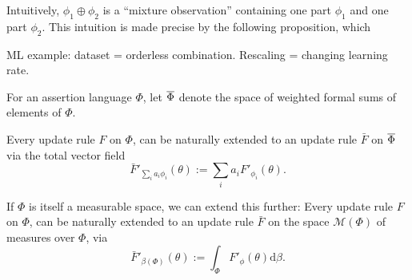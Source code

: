 Intuitively, $\phi_1 \oplus \phi_2$ is a ``mixture observation'' containing
one part $\phi_1$ and one part $\phi_2$. This intuition is made
precise by the following proposition, which 

\begin{prop}
	
\end{prop}

\begin{example}
	ML example: dataset = orderless combination.
	Rescaling = changing learning rate.

	\TODO
	
\end{example}


\begin{defn}
For an assertion language $\Phi$, let $\overline \Phi$ denote
the space of weighted formal sums of elements of $\Phi$.
\end{defn}

\begin{prop}
Every  update rule $F$ on $\Phi$, can be naturally extended to an update rule
$\bar F$ on $\overline \Phi$
via the total vector field
\[
    \bar F'_{\textstyle\sum_i a_i \phi_i} ( \theta ) := \sum_{i} a_i F'_{\phi_i}(\theta).
\]
%
\end{prop}

If $\Phi$ is itself a measurable space, we can extend this further:
Every  update rule $F$ on $\Phi$, can be naturally extended to an update rule $\bar F$ on the space $\mathcal M(\Phi)$ of measures over $\Phi$, via
\[
\bar F'_{\beta(\Phi)}( \theta ) := \int_{\Phi} F'_\phi(\theta) \mathrm d\beta.
\]



%
%

